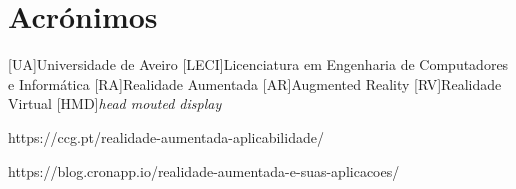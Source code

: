 \documentclass{report}
\begin{document}
\chapter*{Acrónimos}
\begin{acronym}
[UA]{Universidade de Aveiro}
[LECI]{Licenciatura em Engenharia de Computadores e Informática}
[RA]{Realidade Aumentada}
[AR]{Augmented Reality}
[RV]{Realidade Virtual}
[HMD]{\textit{head mouted display}}
\end{acronym}

\printbibliography

https://ccg.pt/realidade-aumentada-aplicabilidade/

https://blog.cronapp.io/realidade-aumentada-e-suas-aplicacoes/
\end{document}
